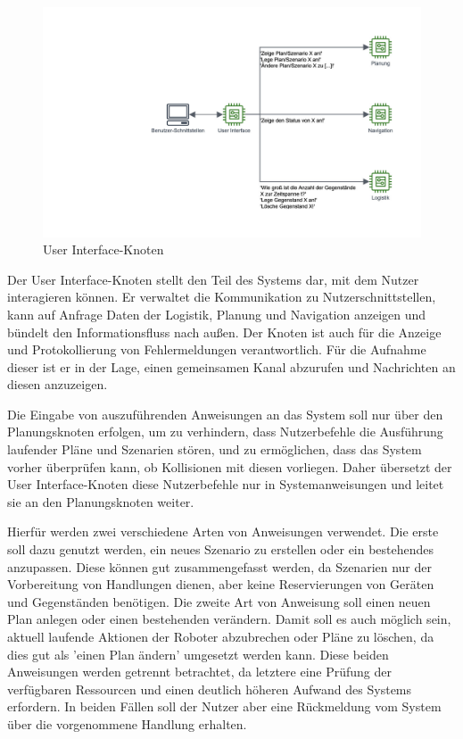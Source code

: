 \begin{figure}[h]
\centering
\includegraphics[width=\textwidth]{Bilder/3_User_Interface.png}
\caption{User Interface-Knoten}
\end{figure}

Der User Interface-Knoten stellt den Teil des Systems dar, mit dem Nutzer interagieren können. Er verwaltet die Kommunikation zu Nutzerschnittstellen, kann auf Anfrage Daten der Logistik, Planung und Navigation anzeigen und bündelt den Informationsfluss nach außen. Der Knoten ist auch für die Anzeige und Protokollierung von Fehlermeldungen verantwortlich. Für die Aufnahme dieser ist er in der Lage, einen gemeinsamen Kanal abzurufen und Nachrichten an diesen anzuzeigen.

Die Eingabe von auszuführenden Anweisungen an das System soll nur über den Planungsknoten erfolgen, um zu verhindern, dass Nutzerbefehle die Ausführung laufender Pläne und Szenarien stören, und zu ermöglichen, dass das System vorher überprüfen kann, ob Kollisionen mit diesen vorliegen. Daher übersetzt der User Interface-Knoten diese Nutzerbefehle nur in Systemanweisungen und leitet sie an den Planungsknoten weiter.

Hierfür werden zwei verschiedene Arten von Anweisungen verwendet. Die erste soll dazu genutzt werden, ein neues Szenario zu erstellen oder ein bestehendes anzupassen. Diese können gut zusammengefasst werden, da Szenarien nur der Vorbereitung von Handlungen dienen, aber keine Reservierungen von Geräten und Gegenständen benötigen. Die zweite Art von Anweisung soll einen neuen Plan anlegen oder einen bestehenden verändern. Damit soll es auch möglich sein, aktuell laufende Aktionen der Roboter abzubrechen oder Pläne zu löschen, da dies gut als 'einen Plan ändern' umgesetzt werden kann. Diese beiden Anweisungen werden getrennt betrachtet, da letztere eine Prüfung der verfügbaren Ressourcen und einen deutlich höheren Aufwand des Systems erfordern. In beiden Fällen soll der Nutzer aber eine Rückmeldung vom System über die vorgenommene Handlung erhalten.

